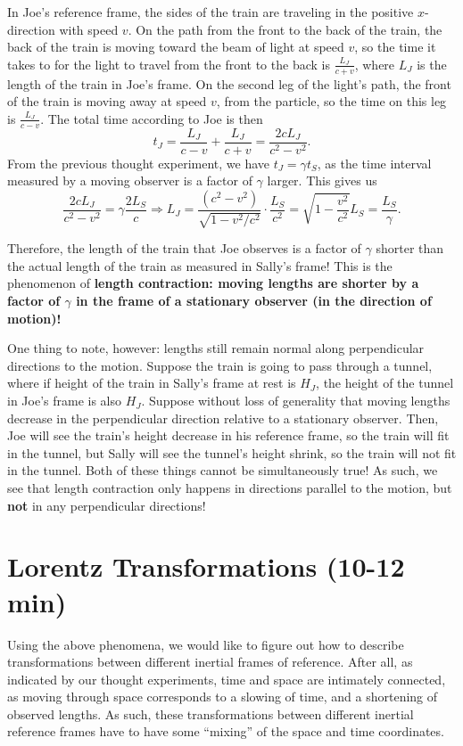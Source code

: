 \documentclass[12pt]{scrartcl}
\begin{document}
In Joe's reference frame, the sides of the train are traveling in the positive $x$-direction with speed $v$. On the path from the front to the back of the train, the back of the train is moving toward the beam of light at speed $v$, so the time it takes to for the light to travel from the front to the back is $\frac{L_J}{c+v}$, where $L_J$ is the length of the train in Joe's frame. On the second leg of the light's path, the front of the train is moving away at speed $v$, from the particle, so the time on this leg is $\frac{L_J}{c-v}$. The total time according to Joe is then
\[
	t_J = \frac{L_J}{c-v} + \frac{L_J}{c+v} = \frac{2cL_J}{c^2-v^2}.
\]
From the previous thought experiment, we have $t_J = \gamma t_S$, as the time interval measured by a moving observer is a factor of $\gamma$ larger. This gives us
\[ \frac{2cL_J}{c^2-v^2} = \gamma \frac{2 L_S}{c} \Rightarrow L_J =  \frac{(c^2-v^2)}{\sqrt{1-v^2/c^2}} \cdot \frac{L_S}{c^2} = \sqrt{1-\frac{v^2}{c^2}} L_S = \frac{L_S}{\gamma} .\]

Therefore, the length of the train that Joe observes is a factor of $\gamma$ shorter than the actual length of the train as measured in Sally's frame! This is the phenomenon of \textbf{length contraction: moving lengths are shorter by a factor of $\gamma$ in the frame of a stationary observer (in the direction of motion)!}

One thing to note, however: lengths still remain normal along perpendicular directions to the motion. Suppose the train is going to pass through a tunnel, where if height of the train in Sally's frame at rest is $H_J$, the height of the tunnel in Joe's frame is also $H_J$. Suppose without loss of generality that moving lengths decrease in the perpendicular direction relative to a stationary observer. Then, Joe will see the train's height decrease in his reference frame, so the train will fit in the tunnel, but Sally will see the tunnel's height shrink, so the train will not fit in the tunnel. Both of these things cannot be simultaneously true! As such, we see that length contraction only happens in directions parallel to the motion, but \textbf{not} in any perpendicular directions!

\section{Lorentz Transformations (10-12 min)}
Using the above phenomena, we would like to figure out how to describe transformations between different inertial frames of reference. After all, as indicated by our thought experiments, time and space are intimately connected, as moving through space corresponds to a slowing of time, and a shortening of observed lengths. As such, these transformations between different inertial reference frames have to have some  ``mixing'' of the space and time coordinates.
\end{document}
